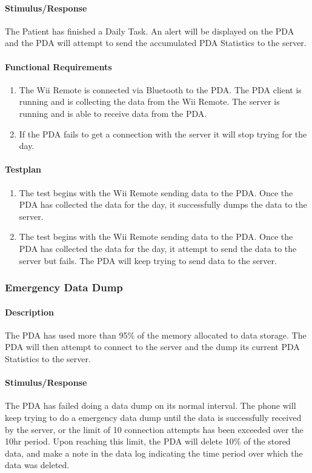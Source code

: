 \documentclass{article}
\begin{document}
\paragraph{Stimulus/Response}
The Patient has finished a Daily Task. An alert will be displayed on the PDA and the PDA will attempt to send the accumulated PDA Statistics to the server.

\paragraph{Functional Requirements}
\begin{enumerate}
\item The Wii Remote is connected via Bluetooth to the PDA. The PDA client is running and is collecting the data from the Wii Remote.  The server is running and is able to receive data from the PDA.
\item If the PDA fails to get a connection with the server it will stop trying for the day.
\end{enumerate}

\paragraph{Testplan}
\begin{enumerate}
\item The test begins with the Wii Remote sending data to the PDA.  Once the PDA has collected the data for the day, it successfully dumps the data to the server.
\item The test begins with the Wii Remote sending data to the PDA.  Once the PDA has collected the data for the day, it attempt to send the data to the server but fails.  The PDA will keep trying to send data to the server.
\end{enumerate}


\subsubsection{Emergency Data Dump}\label{sec: Emer Data Dump}

\paragraph{Description}
The PDA has used more than 95\% of the memory allocated to data storage. The PDA will then attempt to connect to the server and the dump its current PDA Statistics to the server.

\paragraph{Stimulus/Response}
The PDA has failed doing a data dump on its normal interval.  The phone will keep trying to do a emergency data dump until the data is successfully received by the server, or the limit of 10 connection attempts has been exceeded over the 10hr period. Upon reaching this limit, the PDA will delete 10\% of the stored data, and make a note in the data log indicating the time period over which the data was deleted.
\end{document}
